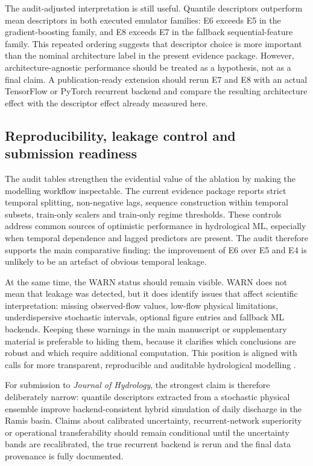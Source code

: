 The audit-adjusted interpretation is still useful. Quantile descriptors
outperform mean descriptors in both executed emulator families: E6
exceeds E5 in the gradient-boosting family, and E8 exceeds E7 in the
fallback sequential-feature family. This repeated ordering suggests
that descriptor choice is more important than the nominal architecture
label in the present evidence package. However, architecture-agnostic
performance should be treated as a hypothesis, not as a final claim. A
publication-ready extension should rerun E7 and E8 with an actual
TensorFlow or PyTorch recurrent backend and compare the resulting
architecture effect with the descriptor effect already measured here.

\subsection{Reproducibility, leakage control and submission readiness}
\label{subsec:discussion-leakage}

The audit tables strengthen the evidential value of the ablation by
making the modelling workflow inspectable. The current evidence package
reports strict temporal splitting, non-negative lags, sequence
construction within temporal subsets, train-only scalers and train-only
regime thresholds. These controls address common sources of optimistic
performance in hydrological ML, especially when temporal dependence and
lagged predictors are present. The audit therefore supports the main
comparative finding: the improvement of E6 over E5 and E4 is unlikely
to be an artefact of obvious temporal leakage.

At the same time, the WARN status should remain visible. WARN does not
mean that leakage was detected, but it does identify issues that affect
scientific interpretation: missing observed-flow values, low-flow
physical limitations, underdispersive stochastic intervals, optional
figure entries and fallback ML backends. Keeping these warnings in the
main manuscript or supplementary material is preferable to hiding them,
because it clarifies which conclusions are robust and which require
additional computation. This position is aligned with calls for more
transparent, reproducible and auditable hydrological modelling
\citep{hall2021hydrologist,lees2021benchmarking,arsenault2022continuous}.

For submission to \emph{Journal of Hydrology}, the strongest claim is
therefore deliberately narrow: quantile descriptors extracted from a
stochastic physical ensemble improve backend-consistent hybrid
simulation of daily discharge in the Ramis basin. Claims about
calibrated uncertainty, recurrent-network superiority or operational
transferability should remain conditional until the uncertainty bands
are recalibrated, the true recurrent backend is rerun and the final data
provenance is fully documented.


